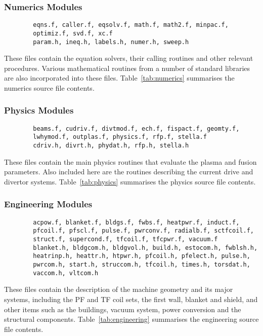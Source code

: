 \documentclass[11pt,a4paper]{report}
\begin{document}
\subsubsection{Numerics Modules}
\begin{verbatim}
        eqns.f, caller.f, eqsolv.f, math.f, math2.f, minpac.f,
        optimiz.f, svd.f, xc.f
        param.h, ineq.h, labels.h, numer.h, sweep.h
\end{verbatim}
These files contain the equation solvers, their calling routines and
other relevant procedures. Various mathematical routines from a number
of standard libraries are also incorporated into these
files. Table~\ref{tab:numerics} summarises the numerics source file
contents.

\subsubsection{Physics Modules}
\begin{verbatim}
        beams.f, cudriv.f, divtmod.f, ech.f, fispact.f, geomty.f,
        lwhymod.f, outplas.f, physics.f, rfp.f, stella.f
        cdriv.h, divrt.h, phydat.h, rfp.h, stella.h
\end{verbatim}
These files contain the main physics routines that evaluate the plasma and
fusion parameters. Also included here are the routines describing the current
drive and divertor systems. Table~\ref{tab:physics} summarises the physics
source file contents.

\subsubsection{Engineering Modules}
\begin{verbatim}
        acpow.f, blanket.f, bldgs.f, fwbs.f, heatpwr.f, induct.f,
        pfcoil.f, pfscl.f, pulse.f, pwrconv.f, radialb.f, sctfcoil.f,
        struct.f, supercond.f, tfcoil.f, tfcpwr.f, vacuum.f
        blanket.h, bldgcom.h, bldgvol.h, build.h, estocom.h, fwblsh.h,
        heatrinp.h, heattr.h, htpwr.h, pfcoil.h, pfelect.h, pulse.h,
        pwrcom.h, start.h, struccom.h, tfcoil.h, times.h, torsdat.h,
        vaccom.h, vltcom.h
\end{verbatim}
These files contain the description of the machine geometry and its major
systems, including the PF and TF coil sets, the first wall, blanket and
shield, and other items such as the buildings, vacuum system, power conversion
and the structural components.  Table~\ref{tab:engineering} summarises the
engineering source file contents.
\end{document}
